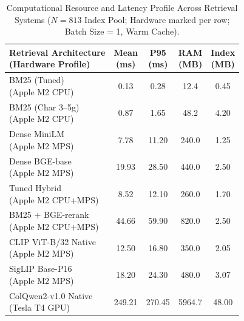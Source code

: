 \begin{table}[t]
\centering
\footnotesize
\caption{Computational Resource and Latency Profile Across Retrieval Systems ($N=813$ Index Pool; Hardware marked per row; Batch Size = 1, Warm Cache).}
\label{tab:system_costs}
\setlength{\tabcolsep}{2.5pt}
\begin{tabular}{@{}p{2.8cm}cccc@{}}
\toprule
\makecell[l]{\textbf{Retrieval Architecture}\\{\scriptsize \textbf{(Hardware Profile)}}} & \makecell{\textbf{Mean}\\\textbf{(ms)}} & \makecell{\textbf{P95}\\\textbf{(ms)}} & \makecell{\textbf{RAM}\\\textbf{(MB)}} & \makecell{\textbf{Index}\\\textbf{(MB)}} \\
\midrule
\makecell[l]{BM25 (Tuned)\\{\scriptsize (Apple M2 CPU)}}             & 0.13 & 0.28 & 12.4 & 0.45 \\
\makecell[l]{BM25 (Char 3--5g)\\{\scriptsize (Apple M2 CPU)}}        & 0.87 & 1.65 & 48.2 & 4.20 \\
\makecell[l]{Dense MiniLM\\{\scriptsize (Apple M2 MPS)}}             & 7.78 & 11.20 & 240.0 & 1.25 \\
\makecell[l]{Dense BGE-base\\{\scriptsize (Apple M2 MPS)}}           & 19.93 & 28.50 & 440.0 & 2.50 \\
\makecell[l]{Tuned Hybrid\\{\scriptsize (Apple M2 CPU+MPS)}}         & 8.52 & 12.10 & 260.0 & 1.70 \\
\makecell[l]{BM25 + BGE-rerank\\{\scriptsize (Apple M2 CPU+MPS)}}    & 44.66 & 59.90 & 820.0 & 2.50 \\
\makecell[l]{CLIP ViT-B/32 Native\\{\scriptsize (Apple M2 MPS)}}     & 12.50 & 16.80 & 350.0 & 2.05 \\
\makecell[l]{SigLIP Base-P16\\{\scriptsize (Apple M2 MPS)}}          & 18.20 & 24.30 & 480.0 & 3.07 \\
\makecell[l]{ColQwen2-v1.0 Native\\{\scriptsize (Tesla T4 GPU)}}     & 249.21 & 270.45 & 5964.7 & 48.00 \\
\bottomrule
\end{tabular}
\end{table}

